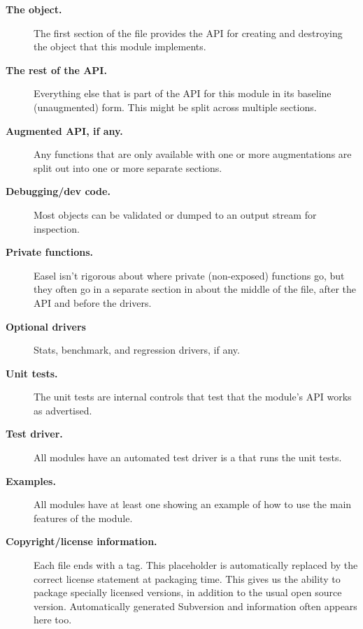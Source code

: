 \begin{description}
\item[\textbf{The  object.}]
  The first section of the file provides the API for creating and
  destroying the object that this module implements.

\item[\textbf{The rest of the API.}]
  Everything else that is part of the API for this module in its
  baseline (unaugmented) form. This might be split across multiple
  sections.

\item[\textbf{Augmented API, if any.}]
  Any functions that are only available with one or more augmentations
  are split out into one or more separate sections. 

\item[\textbf{Debugging/dev code.}]
  Most objects can be validated or dumped to an output stream
  for inspection.

\item[\textbf{Private functions.}]
  Easel isn't rigorous about where private (non-exposed) functions go,
  but they often go in a separate section in about the middle of the
   file, after the API and before the drivers.

\item[\textbf{Optional drivers}] Stats, benchmark, and regression
  drivers, if any. 

\item [\textbf{Unit tests.}]
  The unit tests are internal controls that test that the module's API
  works as advertised.

\item [\textbf{Test driver.}]
  All modules have an automated test driver is a  that
  runs the unit tests.
 
\item [\textbf{Examples.}]
  All modules have at least one  showing an example of
  how to use the main features of the module.

\item [\textbf{Copyright/license information.}]  Each file ends with a
   tag. This placeholder is automatically replaced by
  the correct license statement at packaging time. This gives us the
  ability to package specially licensed versions, in addition to the
  usual open source version. Automatically generated Subversion
   and  information often appears
  here too.

\end{description}

